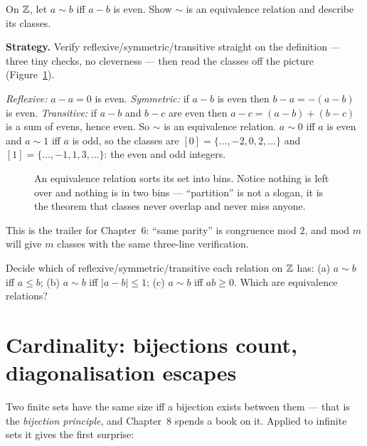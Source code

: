 \begin{example}\label{ex:parityclass}
On $\mathbb{Z}$, let $a \sim b$ iff $a - b$ is even. Show $\sim$ is an equivalence
relation and describe its classes.
\par\smallskip
\textbf{Strategy.} Verify reflexive/symmetric/transitive straight on the
definition --- three tiny checks, no cleverness --- then read the classes off
the picture (Figure~\ref{fig:classes}).
\par\smallskip
\begin{solution}
\emph{Reflexive:} $a - a = 0$ is even. \emph{Symmetric:} if $a - b$ is even
then $b - a = -(a-b)$ is even. \emph{Transitive:} if $a - b$ and $b - c$ are
even then $a - c = (a-b) + (b-c)$ is a sum of evens, hence even. So $\sim$
is an equivalence relation. $a \sim 0$ iff $a$ is even and $a \sim 1$ iff $a$
is odd, so the classes are $[0] = \{\dots,-2,0,2,\dots\}$ and
$[1] = \{\dots,-1,1,3,\dots\}$: the even and odd integers.
\end{solution}
\end{example}

\begin{figure}[ht]\centering

\caption{An equivalence relation sorts its set into bins. Notice nothing is
left over and nothing is in two bins --- ``partition'' is not a slogan, it is
the theorem that classes never overlap and never miss anyone.}
\label{fig:classes}
\end{figure}

This is the trailer for Chapter~6: ``same parity'' is congruence mod $2$, and
mod $m$ will give $m$ classes with the same three-line verification.

\begin{exercise}[medium]\label{exr:rel}
Decide which of reflexive/symmetric/transitive each relation on $\mathbb{Z}$ has:
(a) $a \sim b$ iff $a \le b$; (b) $a \sim b$ iff $|a - b| \le 1$;
(c) $a \sim b$ iff $ab \ge 0$. Which are equivalence relations?
\end{exercise}

\section{Cardinality: bijections count, diagonalisation escapes}\label{sec:cardinality}\label{sec:diag}

Two finite sets have the same size iff a bijection exists between them ---
that is the \emph{bijection principle}, and Chapter~8 spends a book on it.
Applied to infinite sets it gives the first surprise:

